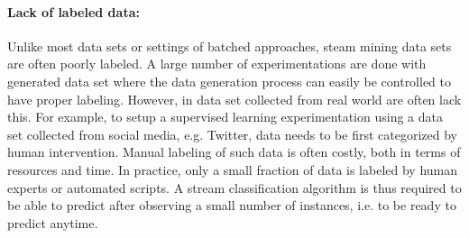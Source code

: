 \documentclass[a4paper, 11pt, oneside]{book}
\begin{document}
\paragraph{Lack of labeled data:}
Unlike most data sets or settings of batched approaches, steam mining data sets are often poorly labeled. A large number of experimentations are done with generated data set where the data generation process can easily be controlled to have proper labeling. However, in data set collected from real world are often lack this. For example, to setup a supervised learning experimentation using a data set collected from social media, e.g. Twitter, data needs to be first categorized by human intervention. Manual labeling of such data is often costly, both in terms of resources and time. In practice, only a small fraction of data is labeled by human experts or automated scripts. A stream classification algorithm is thus required to be able to predict after observing a small number of instances, i.e. to be ready to predict anytime.
\end{document}
